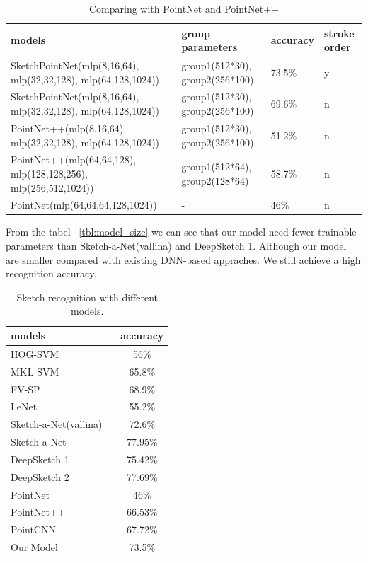 \begin{table}
\centering
\begin{tabular}{llll}
    \hline
     models&group parameters& accuracy& stroke order\\
    \hline
     SketchPointNet(mlp(8,16,64), mlp(32,32,128), mlp(64,128,1024))&group1(512*30), group2(256*100)& 73.5\% & y\\
    \hline
     SketchPointNet(mlp(8,16,64), mlp(32,32,128), mlp(64,128,1024))&group1(512*30), group2(256*100)& 69.6\% & n\\
    \hline
     PointNet++(mlp(8,16,64), mlp(32,32,128), mlp(64,128,1024))&group1(512*30), group2(256*100)& 51.2\% &n\\
    \hline
     PointNet++(mlp(64,64,128), mlp(128,128,256), mlp(256,512,1024))&group1(512*64), group2(128*64)& 58.7\% &n\\
    \hline
     PointNet(mlp(64,64,64,128,1024))&-& 46\% &n\\
    \hline
\end{tabular}
\caption{Comparing with PointNet and PointNet++}
\label{tbl:pointnet_cp}
\end{table}

From the tabel ~\ref{tbl:model_size} we can see that our model need fewer trainable parameters than Sketch-a-Net(vallina) and DeepSketch 1. Although our model are smaller compared with existing DNN-based appraches. We still achieve a high recognition accuracy.

\begin{table}[htbp]
\centering
\begin{tabular}{lc}
    \hline
     models &accuracy\\
    \hline
     HOG-SVM ~\cite{Eitz2012HowDH}& 56\% \\
     MKL-SVM ~\cite{LiHSG15} & 65.8\% \\
     FV-SP ~\cite{Schneider2014SketchCA} & 68.9\% \\
     LeNet ~\cite{LeCun1998GradientbasedLA}& 55.2\% \\
     Sketch-a-Net(vallina) ~\cite{Yu2015SketchaNetTB}& 72.6\% \\
     Sketch-a-Net ~\cite{Yu2015SketchaNetTB}& 77.95\% \\
     DeepSketch 1 ~\cite{Seddati2015DeepSketchDC}& 75.42\% \\
     DeepSketch 2 ~\cite{Dupont2016DeepSketch2D}& 77.69\% \\
     PointNet ~\cite{qi2017pointnet}& 46\% \\
     PointNet++ ~\cite{qi2017pointnetplusplus}& 66.53\% \\
     PointCNN ~\cite{1801.07791}& 67.72\% \\
     Our Model& 73.5\% \\
    \hline
\end{tabular}
\caption{Sketch recognition with different models.}
\label{tbl:acc}
\end{table}

